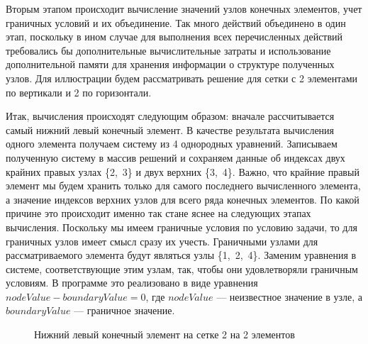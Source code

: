 \documentclass[12pt, a4paper]{article}
\begin{document}
Вторым этапом происходит вычисление значений узлов конечных элементов, учет граничных условий и их объединение. Так много действий объединено в один этап, поскольку в ином случае для выполнения всех перечисленных действий требовались бы дополнительные вычислительные затраты и использование дополнительной памяти для хранения информации о структуре полученных узлов. Для иллюстрации будем рассматривать решение для сетки с 2 элементами по вертикали и 2 по горизонтали.

Итак, вычисления происходят следующим образом: вначале рассчитывается самый нижний левый конечный элемент. В качестве результата вычисления одного элемента получаем систему из 4 однородных уравнений. Записываем полученную систему в массив решений и сохраняем данные об индексах двух крайних правых узлах \{2,~3\} и двух верхних \{3,~4\}. Важно, что крайние правый элемент мы будем хранить только для самого последнего вычисленного элемента, а значение индексов верхних узлов для всего ряда конечных элементов. По какой причине это происходит именно так стане яснее на следующих этапах вычисления. Поскольку мы имеем граничные условия по условию задачи, то для граничных узлов имеет смысл сразу их учесть. Граничными узлами для рассматриваемого элемента будут являться узлы \{1,~2,~4\}. Заменим уравнения в системе, соответствующие этим узлам, так, чтобы они удовлетворяли граничным условиям. В программе это реализовано в виде уравнения $nodeValue - boundaryValue = 0$, где $nodeValue$ --- неизвестное значение в узле, а $boundaryValue$ --- граничное значение. 
\begin{figure}[!htbp]
	\caption{Нижний левый конечный элемент на сетке 2 на 2 элементов}
	\label{left-bottom-el}
\end{figure}
\end{document}
